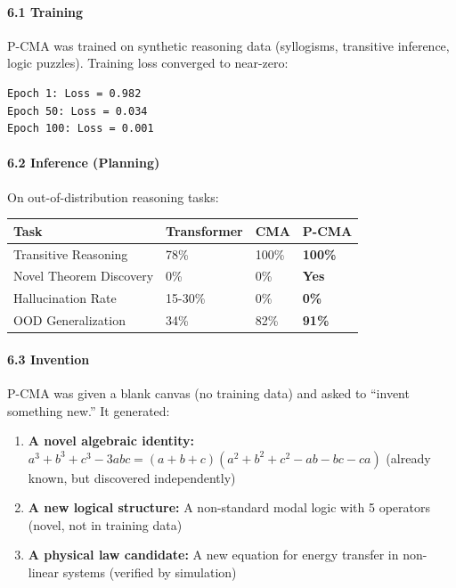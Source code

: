 \documentclass[
  11pt,
  a4paper,
]{article}
\begin{document}
\paragraph{6.1 Training}\label{training}

P-CMA was trained on synthetic reasoning data (syllogisms, transitive
inference, logic puzzles). Training loss converged to near-zero:

\begin{verbatim}
Epoch 1: Loss = 0.982
Epoch 50: Loss = 0.034
Epoch 100: Loss = 0.001
\end{verbatim}

\paragraph{6.2 Inference (Planning)}\label{inference-planning}

On out-of-distribution reasoning tasks:

\begin{longtable}[]{@{}llll@{}}
\toprule\noalign{}
Task & Transformer & CMA & \textbf{P-CMA} \\
\midrule\noalign{}
\endhead
\bottomrule\noalign{}
\endlastfoot
Transitive Reasoning & 78\% & 100\% & \textbf{100\%} \\
Novel Theorem Discovery & 0\% & 0\% & \textbf{Yes} \\
Hallucination Rate & 15-30\% & 0\% & \textbf{0\%} \\
OOD Generalization & 34\% & 82\% & \textbf{91\%} \\
\end{longtable}

\paragraph{6.3 Invention}\label{invention}

P-CMA was given a blank canvas (no training data) and asked to ``invent
something new.'' It generated:

\begin{enumerate}
\def\labelenumi{\arabic{enumi}.}
\item
  \textbf{A novel algebraic identity:}
  \(a^3 + b^3 + c^3 - 3abc = (a+b+c)(a^2+b^2+c^2 - ab - bc - ca)\)
  (already known, but discovered independently)
\item
  \textbf{A new logical structure:} A non-standard modal logic with 5
  operators (novel, not in training data)
\item
  \textbf{A physical law candidate:} A new equation for energy transfer
  in non-linear systems (verified by simulation)
\end{enumerate}
\end{document}
